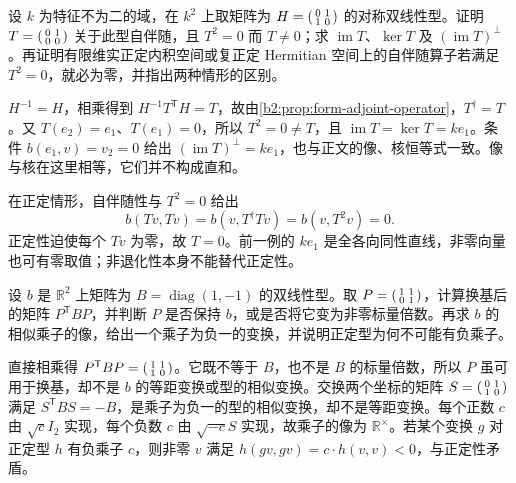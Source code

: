 \begin{exercise}\label{b2:ex:10-adjoint-image-kernel}
	设 \(k\) 为特征不为二的域，在 \(k^2\) 上取矩阵为 \(H=\begin{psmallmatrix}0&1\\1&0\end{psmallmatrix}\) 的对称双线性型。证明 \(T=\begin{psmallmatrix}0&1\\0&0\end{psmallmatrix}\) 关于此型自伴随，且 \(T^2=0\) 而 \(T\ne0\)；求 \(\operatorname{im}T\)、\(\ker T\) 及 \((\operatorname{im}T)^\perp\)。再证明有限维实正定内积空间或复正定 Hermitian 空间上的自伴随算子若满足 \(T^2=0\)，就必为零，并指出两种情形的区别。
\end{exercise}
\begin{solution}
	\(H^{-1}=H\)，相乘得到 \(H^{-1}T^{\mathsf T}H=T\)，故由\cref{b2:prop:form-adjoint-operator}，\(T^\dagger=T\)。又 \(T(e_2)=e_1\)、\(T(e_1)=0\)，所以 \(T^2=0\ne T\)，且 \(\operatorname{im}T=\ker T=ke_1\)。条件 \(b(e_1,v)=v_2=0\) 给出 \((\operatorname{im}T)^\perp=ke_1\)，也与正文的像、核恒等式一致。像与核在这里相等，它们并不构成直和。

	在正定情形，自伴随性与 \(T^2=0\) 给出
	\[
		b(Tv,Tv)=b(v,T^\dagger Tv)=b(v,T^2v)=0.
	\]
	正定性迫使每个 \(Tv\) 为零，故 \(T=0\)。前一例的 \(ke_1\) 是全各向同性直线，非零向量也可有零取值；非退化性本身不能替代正定性。
\end{solution}

\begin{exercise}\label{b2:ex:10-indefinite-similitude-multipliers}
	设 \(b\) 是 \(\mathbb R^2\) 上矩阵为 \(B=\operatorname{diag}(1,-1)\) 的双线性型。取 \(P=\begin{psmallmatrix}1&1\\0&1\end{psmallmatrix}\)，计算换基后的矩阵 \(P^{\mathsf T}BP\)，并判断 \(P\) 是否保持 \(b\)，或是否将它变为非零标量倍数。再求 \(b\) 的相似乘子的像，给出一个乘子为负一的变换，并说明正定型为何不可能有负乘子。
\end{exercise}
\begin{solution}
	直接相乘得 \(P^{\mathsf T}BP=\begin{psmallmatrix}1&1\\1&0\end{psmallmatrix}\)。它既不等于 \(B\)，也不是 \(B\) 的标量倍数，所以 \(P\) 虽可用于换基，却不是 \(b\) 的等距变换或型的相似变换。交换两个坐标的矩阵 \(S=\begin{psmallmatrix}0&1\\1&0\end{psmallmatrix}\) 满足 \(S^{\mathsf T}BS=-B\)，是乘子为负一的型的相似变换，却不是等距变换。每个正数 \(c\) 由 \(\sqrt c I_2\) 实现，每个负数 \(c\) 由 \(\sqrt{-c}S\) 实现，故乘子的像为 \(\mathbb R^\times\)。若某个变换 \(g\) 对正定型 \(h\) 有负乘子 \(c\)，则非零 \(v\) 满足 \(h(gv,gv)=c\cdot h(v,v)<0\)，与正定性矛盾。
\end{solution}

